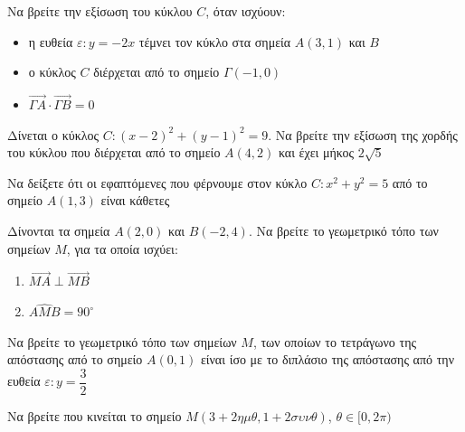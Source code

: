 \documentclass{presentation}
\begin{document}
\begin{askisi}
  Να βρείτε την εξίσωση του κύκλου $C$, όταν ισχύουν:
  \begin{itemize}
    \item η ευθεία $ε:y=-2x$ τέμνει τον κύκλο στα σημεία $Α(3,1)$ και $Β$
    \item ο κύκλος $C$ διέρχεται από το σημείο $Γ(-1,0)$
    \item $\overrightarrow{ΓΑ}\cdot\overrightarrow{ΓΒ}=0$
  \end{itemize}

\end{askisi}

\begin{askisi}
  Δίνεται ο κύκλος $C:(x-2)^2+(y-1)^2=9$. Να βρείτε την εξίσωση της χορδής του κύκλου που διέρχεται από το σημείο $Α(4,2)$ και έχει μήκος $2\sqrt{5}$

\end{askisi}

\begin{askisi}
  Να δείξετε ότι οι εφαπτόμενες που φέρνουμε στον κύκλο $C:x^2+y^2=5$ από το σημείο $Α(1,3)$ είναι κάθετες

\end{askisi}

\begin{askisi}
  Δίνονται τα σημεία $Α(2,0)$ και $Β(-2,4)$. Να βρείτε το γεωμετρικό τόπο των σημείων $Μ$, για τα οποία ισχύει:
  \begin{enumerate}
    \item<1-> $\overrightarrow{ΜΑ}\perp\overrightarrow{ΜΒ}$
    \item<2-> $\widehat{ΑΜΒ}=90^{\circ}$
  \end{enumerate}

\end{askisi}

\begin{askisi}
  Να βρείτε το γεωμετρικό τόπο των σημείων $Μ$, των οποίων το τετράγωνο της απόστασης από το σημείο $Α(0,1)$ είναι ίσο με το διπλάσιο της απόστασης από την ευθεία $ε:y=\dfrac{3}{2}$

\end{askisi}

\begin{askisi}
  Να βρείτε που κινείται το σημείο $Μ(3+2ημθ,1+2συνθ)$, $θ\in [0,2π)$

\end{askisi}
\end{document}
